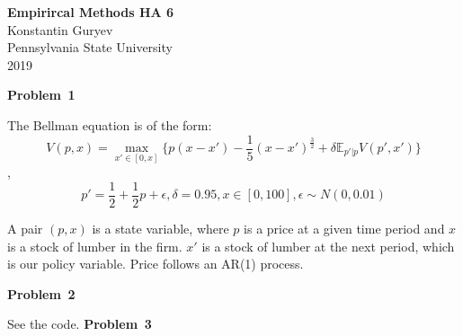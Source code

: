 \documentclass[a4paper,12pt]{article}
\begin{document}
\maketitle \hrulefill
{}

\begin{center}

\textbf {\Large{Empirircal Methods HA 6}}\\
Konstantin Guryev\\
Pennsylvania State University\\
2019
\end{center}

\textbf{Problem \textnumero \,1 }

\vspace{\baselineskip}
The Bellman equation is of the form:
$$V(p,x) = \max\limits_{x'\in [0,x]}\{p(x-x')-\frac{1}{5}(x-x')^{\frac{3}{2}} + \delta \mathds{E}_{p'|p}V(p',x')\}$$,
$$p' = \frac{1}{2} + \frac{1}{2}p + \epsilon, \delta = 0.95,  x \in [0,100], \epsilon \sim N(0, 0.01)$$

A pair $(p,x)$ is a state variable, where $p$ is a price at a given time period and $x$ is a stock of lumber in the firm. $x'$ is a stock of lumber at the next period, which is our policy variable. Price follows an AR(1) process.

\textbf{Problem \textnumero \,2 }

See the code. 
\newpage
\textbf{Problem \textnumero \,3 }
\end{document}
